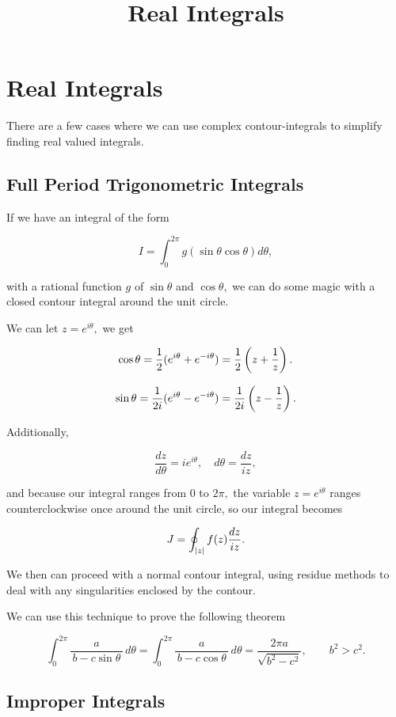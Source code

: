\documentclass{article}
\title{Real Integrals}
\begin{document}
\section{Real Integrals}

There are a few cases where we can use complex \@{contour-integrals} to simplify finding real valued integrals.

\subsection{Full Period Trigonometric Integrals}

If we have an integral of the form

\[ I = \int_0^{2 \pi} g(\sin{\theta} \cos{\theta}) d \theta, \]

with a rational function $g$ of $\sin{\theta}$ and $\cos{\theta},$ we can do some magic with a closed contour integral around the unit circle.

We can let $z = e^{i \theta},$ we get

\[ \cos{\theta} = \frac{1}{2}(e^{i \theta} + e^{-i \theta}) = \frac{1}{2} \left(z + \frac{1}{z}\right). \]

\[ \sin{\theta} = \frac{1}{2i}(e^{i \theta} - e^{-i \theta}) = \frac{1}{2i} \left(z - \frac{1}{z}\right). \]

Additionally,

\[ \frac{dz}{d \theta} = ie^{i \theta}, \quad d \theta = \frac{dz}{iz}, \]

and because our integral ranges from $0$ to $2 \pi,$ the variable $z = e^{i \theta}$ ranges counterclockwise once around the unit circle, so our integral becomes

\[ J = \oint_{\left| z \right|} f(z) \frac{dz}{iz}. \]

We then can proceed with a normal contour integral, using \@{residue} methods to deal with any \@{singularities} enclosed by the contour.

We can use this technique to prove the following theorem

\begin{theorem}
\[ \int_{0}^{2\pi} \frac{a}{\,b - c\sin\theta\,}\,d\theta
=
\int_{0}^{2\pi} \frac{a}{\,b - c\cos\theta\,}\,d\theta
=
\frac{2\pi a}{\sqrt{b^{2}-c^{2}}}, \qquad b^{2} > c^{2}. \]
\end{theorem}

\subsection{Improper Integrals}
\end{document}
